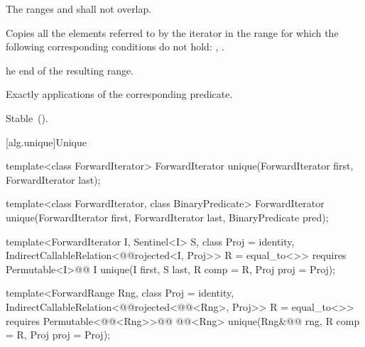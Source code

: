 \begin{itemdescr}
\pnum
\requires
The ranges
and
shall not overlap.

\pnum
\effects
Copies all the elements referred to by the iterator
in the range
for which the following corresponding conditions do not hold:
,
.

\pnum
\returns
{}he end of the resulting range.

\pnum
\complexity
Exactly
applications of the corresponding predicate.

\pnum
\remarks Stable~().
\end{itemdescr}

[alg.unique]{Unique}

%
\begin{removedblock}
\begin{itemdecl}
template<class ForwardIterator>
  ForwardIterator unique(ForwardIterator first, ForwardIterator last);

template<class ForwardIterator, class BinaryPredicate>
  ForwardIterator unique(ForwardIterator first, ForwardIterator last,
                         BinaryPredicate pred);
\end{itemdecl}
\end{removedblock}
\begin{addedblock}
\begin{itemdecl}
template<ForwardIterator I, Sentinel<I> S, class Proj = identity,
    IndirectCallableRelation<@@rojected<I, Proj>> R = equal_to<>>
  requires Permutable<I>@\newtxt{()}@
  I unique(I first, S last, R comp = R{}, Proj proj = Proj{});

template<ForwardRange Rng, class Proj = identity,
    IndirectCallableRelation<@@rojected<@@<Rng>, Proj>> R = equal_to<>>
  requires Permutable<@@<Rng>>@\newtxt{()}@
  @@<Rng>
    unique(Rng&@\newtxt{\&}@ rng, R comp = R{}, Proj proj = Proj{});
\end{itemdecl}
\end{addedblock}

